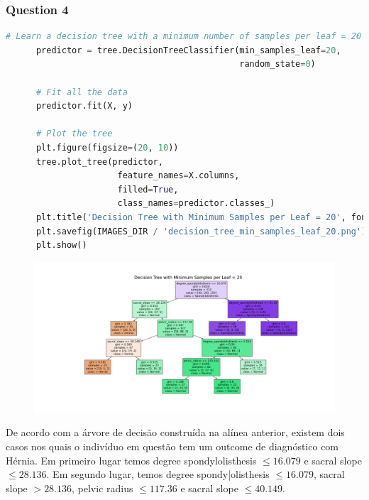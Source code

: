 \documentclass{article}
\begin{document}
\subsubsection*{Question 4}

    \begin{lstlisting}[language=Python]
      # Learn a decision tree with a minimum number of samples per leaf = 20
      predictor = tree.DecisionTreeClassifier(min_samples_leaf=20,
                                              random_state=0)
      
      # Fit all the data
      predictor.fit(X, y)
      
      # Plot the tree
      plt.figure(figsize=(20, 10))
      tree.plot_tree(predictor,
                      feature_names=X.columns,
                      filled=True,
                      class_names=predictor.classes_)
      plt.title('Decision Tree with Minimum Samples per Leaf = 20', fontsize=20)
      plt.savefig(IMAGES_DIR / 'decision_tree_min_samples_leaf_20.png')
      plt.show()
    \end{lstlisting}

    \begin{figure}[H]
      \centering
      \includegraphics[width=1\linewidth]{images/decision_tree_min_samples_leaf_20.png}
    \end{figure}

De acordo com a árvore de decisão construída na alínea anterior, existem dois casos nos quais o indivíduo em questão tem um outcome de diagnóstico com Hérnia. Em primeiro lugar temos degree spondylolisthesis $\leq 16.079$ e sacral slope $\leq 28.136$. 
Em segundo lugar, temos degree spondy|olisthesis $\leq 16.079$, sacral slope $> 28.136$, pelvic radius $ \leq 117.36$ e sacral slope $\leq 40.149$.
\end{document}
